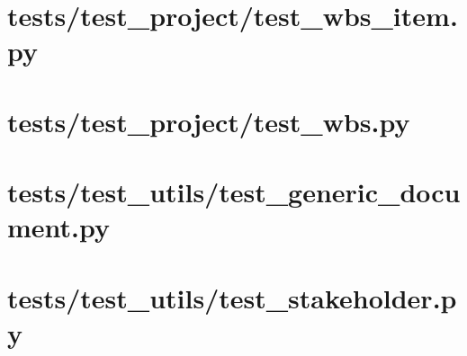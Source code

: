\pagebreak

\section{tests/test\_project/test\_wbs\_item.py}


\pagebreak

\section{tests/test\_project/test\_wbs.py}


\pagebreak

\section{tests/test\_utils/test\_generic\_document.py}


\pagebreak

\section{tests/test\_utils/test\_stakeholder.py}

